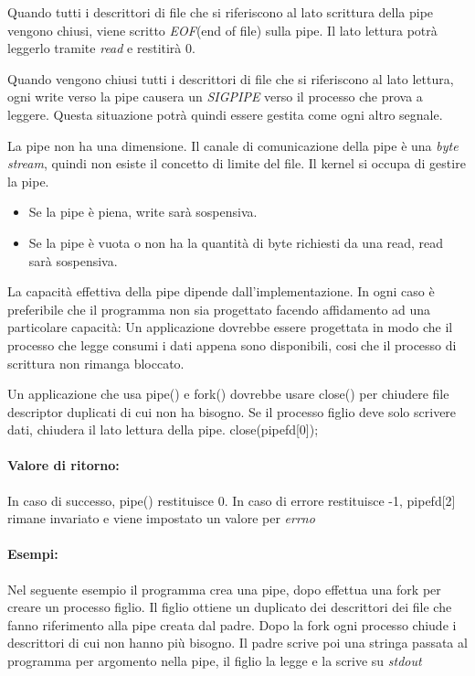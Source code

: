 \documentclass
[10pt,        %
 a4paper,     %
 onecolumn,   %
 fleqn,       %
 oneside,     %
 notitlepage, %
]{article}    %
\begin{document}
Quando tutti i descrittori di file che si riferiscono al lato scrittura della pipe vengono chiusi, viene scritto \textit{EOF}(end of file) sulla pipe. Il lato lettura potrà leggerlo tramite \textit{read} e restitirà 0.



Quando vengono chiusi tutti i descrittori di file che si riferiscono al lato lettura, ogni write verso la pipe causera un \textit{SIGPIPE} verso il processo che prova a leggere. Questa situazione potrà quindi essere gestita come ogni altro segnale.



La pipe non ha una dimensione. Il canale di comunicazione della pipe è una \textit{byte stream}, quindi non esiste il concetto di limite del file. Il kernel si occupa di gestire la pipe.
\begin{itemize}
    \item Se la pipe è piena, write sarà sospensiva.
    \item Se la pipe è vuota o non ha la quantità di byte richiesti da una read, read sarà sospensiva.
\end{itemize}

La capacità effettiva della pipe dipende dall'implementazione. In ogni caso è preferibile che il programma non sia progettato facendo affidamento ad una particolare capacità: Un applicazione dovrebbe essere progettata in modo che il processo che legge consumi i dati appena sono disponibili, cosi che il processo di scrittura non rimanga bloccato.

Un applicazione che usa pipe() e fork() dovrebbe usare close() per chiudere file descriptor duplicati di cui non ha bisogno. Se il processo figlio deve solo scrivere dati, chiudera il lato lettura della pipe. close(pipefd[0]);



\paragraph{Valore di ritorno:}
In caso di successo, pipe() restituisce 0. In caso di errore restituisce -1, pipefd[2] rimane invariato e viene impostato un valore per \textit{errno}

\paragraph{Esempi:}
Nel seguente esempio il programma crea una pipe, dopo effettua una fork per creare un processo figlio. Il figlio ottiene un duplicato dei descrittori dei file che fanno riferimento alla pipe creata dal padre. Dopo la fork ogni processo chiude i descrittori di cui non hanno più bisogno. Il padre scrive poi una stringa passata al programma per argomento nella pipe, il figlio la legge e la scrive su \textit{stdout}

\end{document}
